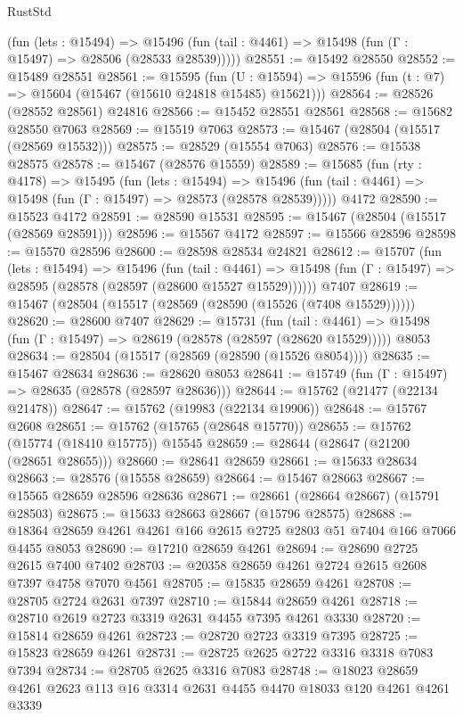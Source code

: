 \begin{lexlean}{RustStd}
\begin{coremodule}
      (fun (lets : @15494) =>
      @15496 (fun (tail : @4461) => @15498 (fun (Γ : @15497) => @28506 (@28533 @28539)))))
@28551 := @15492 @28550
@28552 := @15489 @28551
@28561 := @15595
    (fun (U : @15594) => @15596 (fun (t : @7) => @15604 (@15467 (@15610 @24818 @15485) @15621)))
@28564 := @28526 (@28552 @28561) @24816
@28566 := @15452 @28551 @28561
@28568 := @15682 @28550 @7063
@28569 := @15519 @7063
@28573 := @15467 (@28504 (@15517 (@28569 @15532)))
@28575 := @28529 (@15554 @7063)
@28576 := @15538 @28575
@28578 := @15467 (@28576 @15559)
@28589 := @15685
    (fun (rty : @4178) =>
    @15495
      (fun (lets : @15494) =>
      @15496 (fun (tail : @4461) => @15498 (fun (Γ : @15497) => @28573 (@28578 @28539)))))
    @4172
@28590 := @15523 @4172
@28591 := @28590 @15531
@28595 := @15467 (@28504 (@15517 (@28569 @28591)))
@28596 := @15567 @4172
@28597 := @15566 @28596
@28598 := @15570 @28596
@28600 := @28598 @28534 @24821
@28612 := @15707
    (fun (lets : @15494) =>
    @15496
      (fun (tail : @4461) =>
      @15498 (fun (Γ : @15497) => @28595 (@28578 (@28597 (@28600 @15527 @15529))))))
    @7407
@28619 := @15467 (@28504 (@15517 (@28569 (@28590 (@15526 (@7408 @15529))))))
@28620 := @28600 @7407
@28629 := @15731
    (fun (tail : @4461) => @15498 (fun (Γ : @15497) => @28619 (@28578 (@28597 (@28620 @15529)))))
    @8053
@28634 := @28504 (@15517 (@28569 (@28590 (@15526 @8054))))
@28635 := @15467 @28634
@28636 := @28620 @8053
@28641 := @15749 (fun (Γ : @15497) => @28635 (@28578 (@28597 @28636)))
@28644 := @15762 (@21477 (@22134 @21478))
@28647 := @15762 (@19983 (@22134 @19906))
@28648 := @15767 @2608
@28651 := @15762 (@15765 (@28648 @15770))
@28655 := @15762 (@15774 (@18410 @15775)) @15545
@28659 := @28644 (@28647 (@21200 (@28651 @28655)))
@28660 := @28641 @28659
@28661 := @15633 @28634
@28663 := @28576 (@15558 @28659)
@28664 := @15467 @28663
@28667 := @15565 @28659 @28596 @28636
@28671 := @28661 (@28664 @28667) (@15791 @28503)
@28675 := @15633 @28663 @28667 (@15796 @28575)
@28688 := @18364 @28659 @4261 @4261 @166 @2615 @2725 @2803 @51 @7404 @166 @7066 @4455 @8053
@28690 := @17210 @28659 @4261
@28694 := @28690 @2725 @2615 @7400 @7402
@28703 := @20358 @28659 @4261 @2724 @2615 @2608 @7397 @4758 @7070 @4561
@28705 := @15835 @28659 @4261
@28708 := @28705 @2724 @2631 @7397
@28710 := @15844 @28659 @4261
@28718 := @28710 @2619 @2723 @3319 @2631 @4455 @7395 @4261 @3330
@28720 := @15814 @28659 @4261
@28723 := @28720 @2723 @3319 @7395
@28725 := @15823 @28659 @4261
@28731 := @28725 @2625 @2722 @3316 @3318 @7083 @7394
@28734 := @28705 @2625 @3316 @7083
@28748 := @18023 @28659 @4261 @2623 @113 @16 @3314 @2631 @4455 @4470 @18033 @120 @4261 @4261 @3339

\end{coremodule}
\end{lexlean}
